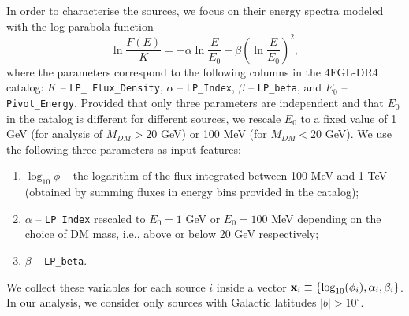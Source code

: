 \documentclass[12pt, a4paper]{article}
\newcommand{\red}[1]{\textcolor{red}{#1}}
\newcommand{\aure}[1]{\textcolor{orange}{[AA: #1]}}
\newcommand{\be}{\begin{equation}}
\newcommand{\ee}{\end{equation}}
\newcommand{\ben}{\begin{enumerate}}
\newcommand{\een}{\end{enumerate}}
\newcommand{\bx}{{\bf x}}
\begin{document}
In order to characterise the sources, we focus on their energy spectra modeled with the log-parabola function
\be
\label{eq:log_par}
\ln \frac{F(E)}{K} = - \alpha \ln \frac{E}{E_0} - \beta \left(\ln \frac{E}{E_0} \right)^2,
\ee
where the parameters correspond to the following columns in the 4FGL-DR4 catalog:
$K$ -- {\tt LP\_ Flux\_Density},
$\alpha$ -- {\tt LP\_Index},
$\beta$ -- {\tt LP\_beta},
and $E_0$ -- {\tt Pivot\_Energy}.
Provided that only three parameters are independent and that $E_0$ in the catalog is different for different sources, we rescale $E_0$ to a fixed value of 1 GeV (for analysis of $M_{DM}> 20$ GeV) or 100 MeV (for $M_{DM} < 20$ GeV). 
We use the following three parameters as input features:
\ben
\item 
$\log_{10}\phi$ -- the logarithm of the
 flux integrated between 100 MeV and 1 TeV (obtained by summing fluxes in energy bins provided in the catalog);
\item 
$\alpha$ -- {\tt LP\_Index} rescaled to $E_0 = 1$ GeV or $E_0 = 100$ MeV depending on the choice of DM mass, i.e., above or below 20 GeV respectively;
\item
$\beta$ -- {\tt LP\_beta}.
\een
We collect these variables for each source $i$ inside a vector ${\bx}_i\equiv \{\log_{10}(\phi_i), \alpha_i, \beta_i\}$.
In our analysis, we consider only sources with Galactic latitudes $|b| > 10^\circ$.
\end{document}
